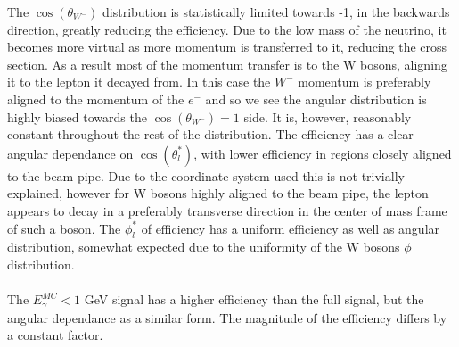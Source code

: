 The $\cos{({\theta}_{{W}^{-}})}$ distribution is statistically limited towards -1, in the backwards direction, greatly reducing the efficiency. Due to the low mass of the neutrino, it becomes more virtual as more momentum is transferred to it, reducing the cross section. As a result most of the momentum transfer is to the W bosons, aligning it to the lepton it decayed from. In this case the ${W}^{-}$ momentum is preferably aligned to the momentum of the ${e}^{-}$ and so we see the angular distribution is highly biased towards the $\cos{({\theta}_{{W}^{-}})} = 1$ side. It is, however, reasonably constant throughout the rest of the distribution. The efficiency has a clear angular dependance on $\cos{({\theta}_{l}^{*})}$, with lower efficiency in regions closely aligned to the beam-pipe. Due to the coordinate system used this is not trivially explained, however for W bosons highly aligned to the beam pipe, the lepton appears to decay in a preferably transverse direction in the center of mass frame of such a boson. The ${\phi}_{l}^{*}$ of efficiency has a uniform efficiency as well as angular distribution, somewhat expected due to the uniformity of the W bosons ${\phi}$ distribution.
\\\\
The ${E}_{\gamma}^{MC} < 1$ GeV signal has a higher efficiency than the full signal, but the angular dependance as a similar form. The magnitude of the efficiency differs by a constant factor.

